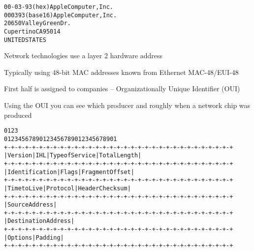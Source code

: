 \documentclass[Screen16to9,17pt]{foils}
\begin{document}

\begin{alltt}
00-03-93   (hex)        Apple Computer, Inc.
000393     (base 16)    Apple Computer, Inc.
                        20650 Valley Green Dr.
                        Cupertino CA 95014
                        UNITED STATES
\end{alltt}
\begin{list1}
\item Network technologies use a layer 2 hardware address
\item Typically using 48-bit MAC addresses known from Ethernet MAC-48/EUI-48
\item First half is assigned to companies -- Organizationally Unique Identifier (OUI)
\item Using the OUI you can see which producer and roughly when a network chip was produced
\item {}
\end{list1}





\begin{alltt}\footnotesize
    0                   1                   2                   3
    0 1 2 3 4 5 6 7 8 9 0 1 2 3 4 5 6 7 8 9 0 1 2 3 4 5 6 7 8 9 0 1
   +-+-+-+-+-+-+-+-+-+-+-+-+-+-+-+-+-+-+-+-+-+-+-+-+-+-+-+-+-+-+-+-+
   |Version|  IHL  |Type of Service|          Total Length         |
   +-+-+-+-+-+-+-+-+-+-+-+-+-+-+-+-+-+-+-+-+-+-+-+-+-+-+-+-+-+-+-+-+
   |         Identification        |Flags|      Fragment Offset    |
   +-+-+-+-+-+-+-+-+-+-+-+-+-+-+-+-+-+-+-+-+-+-+-+-+-+-+-+-+-+-+-+-+
   |  Time to Live |    Protocol   |         Header Checksum       |
   +-+-+-+-+-+-+-+-+-+-+-+-+-+-+-+-+-+-+-+-+-+-+-+-+-+-+-+-+-+-+-+-+
   |                       Source Address                          |
   +-+-+-+-+-+-+-+-+-+-+-+-+-+-+-+-+-+-+-+-+-+-+-+-+-+-+-+-+-+-+-+-+
   |                    Destination Address                        |
   +-+-+-+-+-+-+-+-+-+-+-+-+-+-+-+-+-+-+-+-+-+-+-+-+-+-+-+-+-+-+-+-+
   |                    Options                    |    Padding    |
   +-+-+-+-+-+-+-+-+-+-+-+-+-+-+-+-+-+-+-+-+-+-+-+-+-+-+-+-+-+-+-+-+
\end{alltt}
\end{document}
